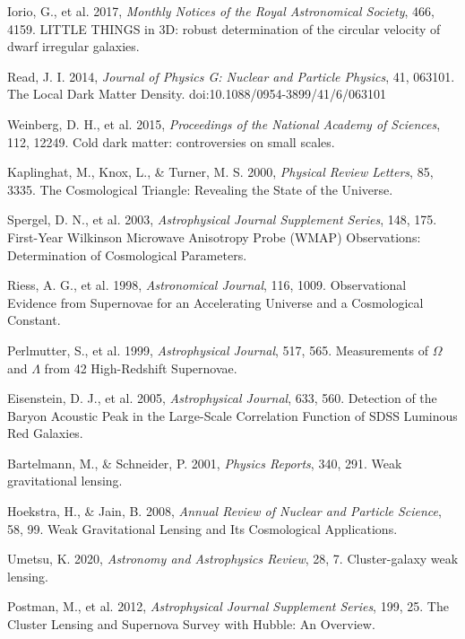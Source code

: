 \documentclass[12pt,a4paper]{article}
\begin{document}
\begin{thebibliography}{99}
 Iorio, G., et al. 2017, \textit{Monthly Notices of the Royal Astronomical Society}, 466, 4159. LITTLE THINGS in 3D: robust determination of the circular velocity of dwarf irregular galaxies.

 Read, J. I. 2014, \textit{Journal of Physics G: Nuclear and Particle Physics}, 41, 063101. The Local Dark Matter Density. doi:10.1088/0954-3899/41/6/063101

 Weinberg, D. H., et al. 2015, \textit{Proceedings of the National Academy of Sciences}, 112, 12249. Cold dark matter: controversies on small scales.

 Kaplinghat, M., Knox, L., \& Turner, M. S. 2000, \textit{Physical Review Letters}, 85, 3335. The Cosmological Triangle: Revealing the State of the Universe.

 Spergel, D. N., et al. 2003, \textit{Astrophysical Journal Supplement Series}, 148, 175. First-Year Wilkinson Microwave Anisotropy Probe (WMAP) Observations: Determination of Cosmological Parameters.

 Riess, A. G., et al. 1998, \textit{Astronomical Journal}, 116, 1009. Observational Evidence from Supernovae for an Accelerating Universe and a Cosmological Constant.

 Perlmutter, S., et al. 1999, \textit{Astrophysical Journal}, 517, 565. Measurements of $\Omega$ and $\Lambda$ from 42 High-Redshift Supernovae.

 Eisenstein, D. J., et al. 2005, \textit{Astrophysical Journal}, 633, 560. Detection of the Baryon Acoustic Peak in the Large-Scale Correlation Function of SDSS Luminous Red Galaxies.

 Bartelmann, M., \& Schneider, P. 2001, \textit{Physics Reports}, 340, 291. Weak gravitational lensing.

 Hoekstra, H., \& Jain, B. 2008, \textit{Annual Review of Nuclear and Particle Science}, 58, 99. Weak Gravitational Lensing and Its Cosmological Applications.

 Umetsu, K. 2020, \textit{Astronomy and Astrophysics Review}, 28, 7. Cluster-galaxy weak lensing.

 Postman, M., et al. 2012, \textit{Astrophysical Journal Supplement Series}, 199, 25. The Cluster Lensing and Supernova Survey with Hubble: An Overview.


\end{thebibliography}
\end{document}
